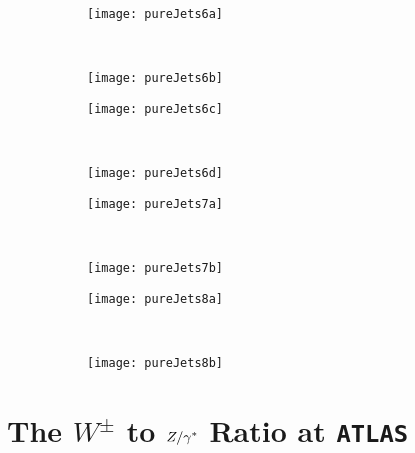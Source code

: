 	\begin{figure}[H]
		\centering
		\begin{subfigure}[b]{0.48\textwidth}
			\texttt{[image: pureJets6a]}
			\caption{}
			\label{fig:}
		\end{subfigure}
		~
		\begin{subfigure}[b]{0.48\textwidth}
			\texttt{[image: pureJets6b]}
			\caption{}
			\label{fig:}
		\end{subfigure}
		\caption{}
		\label{fig:}

		\begin{subfigure}[b]{0.48\textwidth}
			\texttt{[image: pureJets6c]}
			\caption{}
			\label{fig:}
		\end{subfigure}
		~
		\begin{subfigure}[b]{0.48\textwidth}
			\texttt{[image: pureJets6d]}
			\caption{}
			\label{fig:}
		\end{subfigure}
		\caption{}
		\label{fig:}
	\end{figure}

	\begin{figure}[H]
		\centering
		\begin{subfigure}[b]{0.48\textwidth}
			\texttt{[image: pureJets7a]}
			\caption{}
			\label{fig:}
		\end{subfigure}
		~
		\begin{subfigure}[b]{0.48\textwidth}
			\texttt{[image: pureJets7b]}
			\caption{}
			\label{fig:}
		\end{subfigure}
		\caption{}
		\label{fig:}

		\begin{subfigure}[b]{0.48\textwidth}
			\texttt{[image: pureJets8a]}
			\caption{}
			\label{fig:}
		\end{subfigure}
		~
		\begin{subfigure}[b]{0.48\textwidth}
			\texttt{[image: pureJets8b]}
			\caption{}
			\label{fig:}
		\end{subfigure}
		\caption{}
		\label{fig:}
	\end{figure}

\chapter{The $W^\pm$ to $Z/\gamma^*$ Ratio at \texttt{ATLAS}}
\label{chap:WZRatio}

